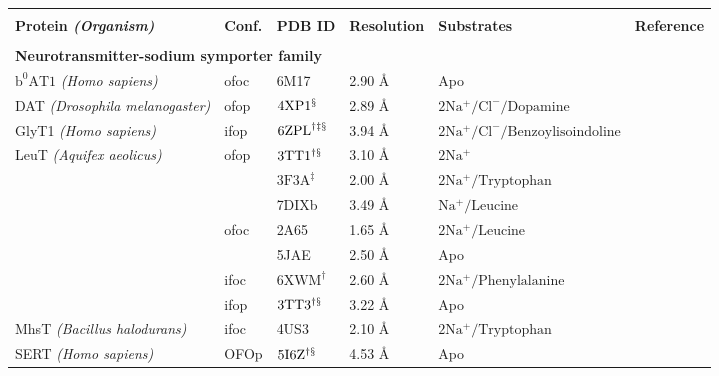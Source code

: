 


\begin{center}
\begin{tabular}{l l l l l r}
\toprule \\
\textbf{Protein \emph{(Organism)}} & \textbf{Conf.} & \textbf{PDB ID} & \textbf{Resolution} & \textbf{Substrates} & \textbf{Reference} \\
\midrule \\

\multicolumn{5}{l}{\textbf{Neurotransmitter-sodium symporter family}} \\
$\mathrm{b^{0}AT1}$ \emph{(Homo sapiens)} & \gls{ofoc} & 6M17 & 2.90 \AA & Apo & \citep*{Yan2020b} \\
DAT \emph{(Drosophila melanogaster)} & \gls{ofop} & $\mathrm{4XP1^\mathsection}$ & 2.89 \AA & $\mathrm{2Na^+/Cl^-/Dopamine}$ & \citep*{Penmatsa2015} \\
GlyT1 \emph{(Homo sapiens)} & \gls{ifop} & $\mathrm{6ZPL}^{\dagger \ddagger \mathsection}$ & 3.94 \AA & $ \mathrm{2Na^+/Cl^-/Benzoylisoindoline}$ & \citep*{Shahsavar2021} \\
LeuT \emph{(Aquifex aeolicus)} & \gls{ofop} & $\mathrm{3TT1^{\dagger \mathsection}}$ & 3.10 \AA & $\mathrm{2Na^+}$ & \citep*{Krishnamurthy2012} \\
& & $\mathrm{3F3A^{\ddagger}}$ & 2.00 \AA & $\mathrm{2Na^+/Tryptophan}$ & \citep*{Singh2008} \\
& & 7DIXb & 3.49 \AA & $\mathrm{Na^+/Leucine}$ & \citep*{Fan2021} \\
& \gls{ofoc} & 2A65 & 1.65 \AA & $\mathrm{2Na^+/Leucine}$ & \citep*{Yamashita2005} \\
& & 5JAE & 2.50 \AA & Apo & \citep*{Malinauskaite2016} \\
& \gls{ifoc} & $\mathrm{6XWM^\dagger}$ & 2.60 \AA & $\mathrm{2Na^+/Phenylalanine}$ & \cite*{Gotfryd2020} \\
& \gls{ifop} & $\mathrm{3TT3^{\dagger \mathsection}}$ & 3.22 \AA & Apo & \citep*{Krishnamurthy2012} \\
MhsT \emph{(Bacillus halodurans)} & \gls{ifoc} & 4US3 & 2.10 \AA & $\mathrm{2Na^+/Tryptophan}$ & \citep*{Malinauskaite2014} \\
SERT \emph{(Homo sapiens)} & OFOp & $\mathrm{5I6Z^{\dagger \mathsection}}$ & 4.53 \AA & Apo & \citep*{Coleman2016} \\

\end{tabular}
\end{center}
